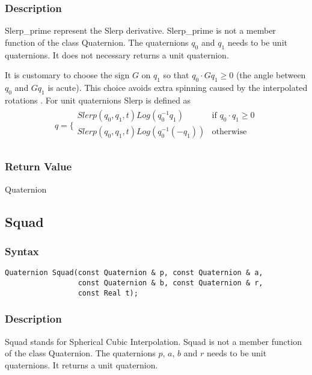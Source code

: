 \documentclass[dvips,11pt,fleqn]{report}
\begin{document}
\subsubsection{Description}
Slerp\_prime represent the Slerp derivative.  Slerp\_prime is not a
member function of the class Quaternion.  The quaternions $q_0$ and
$q_1$ needs to be unit quaternions.  It does not necessary returns a
unit quaternion.

It is customary to choose the sign $G$ on $q_1$ so that $q_0 \cdot
Gq_1 \geq 0$ (the angle between $q_0$ and $Gq_1$ is acute). This
choice avoids extra spinning caused by the interpolated rotations
\cite{Dam98}. For unit quaternions Slerp is defined as
\begin{eqnarray}
 q = \Bigg\{
  \begin{array}{cc}
    Slerp(q_0, q_1, t)Log(q_0^{-1}q_1) & \textrm{if $q_0 \cdot q_1 \geq 0$} \\
    Slerp(q_0, q_1, t)Log(q_0^{-1}(-q_1)) & \textrm{otherwise} \\
  \end{array}
\end{eqnarray}

\subsubsection*{Return Value}

Quaternion

\newpage

\subsection*{Squad}

\subsubsection*{Syntax}
\begin{verbatim}
Quaternion Squad(const Quaternion & p, const Quaternion & a, 
                 const Quaternion & b, const Quaternion & r, 
                 const Real t);
\end{verbatim}
\subsubsection{Description}
Squad stands for Spherical Cubic Interpolation. Squad is not a member
function of the class Quaternion. The quaternions $p$, $a$, $b$ and
$r$ needs to be unit quaternions. It returns a unit quaternion.
\end{document}
